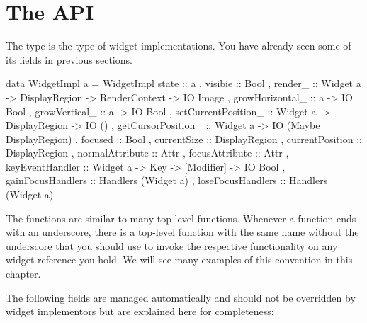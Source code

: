 \section{The  API}
\label{sec:widgetimpl_api}

The  type is the type of widget implementations.  You
have already seen some of its fields in previous sections.

\begin{haskellcode}
 data WidgetImpl a = WidgetImpl {
       state :: a
     , visibie :: Bool
     , render_ :: Widget a -> DisplayRegion -> RenderContext
               -> IO Image
     , growHorizontal_ :: a -> IO Bool
     , growVertical_ :: a -> IO Bool
     , setCurrentPosition_ :: Widget a -> DisplayRegion -> IO ()
     , getCursorPosition_ :: Widget a -> IO (Maybe DisplayRegion)
     , focused :: Bool
     , currentSize :: DisplayRegion
     , currentPosition :: DisplayRegion
     , normalAttribute :: Attr
     , focusAttribute :: Attr
     , keyEventHandler :: Widget a -> Key -> [Modifier] -> IO Bool
     , gainFocusHandlers :: Handlers (Widget a)
     , loseFocusHandlers :: Handlers (Widget a)
     }
\end{haskellcode}

The  functions are similar to many top-level functions.
Whenever a  function ends with an underscore, there
is a top-level function with the same name without the underscore that
you should use to invoke the respective functionality on any widget
reference you hold.  We will see many examples of this convention in
this chapter.

The following fields are managed automatically and should not be
overridden by widget implementors but are explained here for
completeness:

